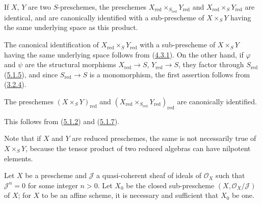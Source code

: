 \begin{proposition}[5.1.7]
\label{I.5.1.7}
If $X$, $Y$ are two $S$-preschemes, the preschemes
$X_{\mathrm{red}}\times_{S_{\mathrm{red}}}Y_{\mathrm{red}}$ and
$X_{\mathrm{red}}\times_S Y_{\mathrm{red}}$ are identical, and
are canonically identified with a sub-prescheme of $X\times_S Y$ having the
same underlying space as this product.
\end{proposition}

The canonical identification of $X_{\mathrm{red}}\times_S Y_{\mathrm{red}}$
with a sub-prescheme of $X\times_S Y$ having the same underlying space follows
from (\hyperref[I.4.3.1]{4.3.1}). On the other hand, if $\varphi$ and
$\psi$ are the structural morphisms $X_{\mathrm{red}}\to S$,
$Y_{\mathrm{red}}\to S$, they factor through $S_{\mathrm{red}}$
(\hyperref[I.5.1.5]{5.1.5}), and since $S_{\mathrm{red}}\to S$ is a
monomorphism, the first assertion follows from
(\hyperref[I.3.2.4]{3.2.4}).

\begin{corollary}[5.1.8]
\label{I.5.1.8}
The preschemes $(X\times_S Y)_{\mathrm{red}}$ and
$(X_{\mathrm{red}}\times_{S_{\mathrm{red}}}Y_{\mathrm{red}})_{\mathrm{red}}$
are canonically identified.
\end{corollary}

This follows from (\hyperref[I.5.1.2]{5.1.2}) and
(\hyperref[I.5.1.7]{5.1.7}).

Note that if $X$ and $Y$ are reduced preschemes, the same is not
necessarily true of $X\times_S Y$, because the tensor product of two
reduced algebras can have nilpotent elements.

\begin{proposition}[5.1.9]
\label{I.5.1.9}
Let $X$ be a prescheme and $\mathscr{J}$ a quasi-coherent sheaf of ideals of
$\mathscr{O}_X$ such that $\mathscr{J}^n=0$ for some integer $n>0$. Let $X_0$
be the closed sub-prescheme $(X,\mathscr{O}_X/\mathscr{J})$ of $X$; for $X$
to be an affine scheme, it is necessary and sufficient that $X_0$ be one.
\end{proposition}

